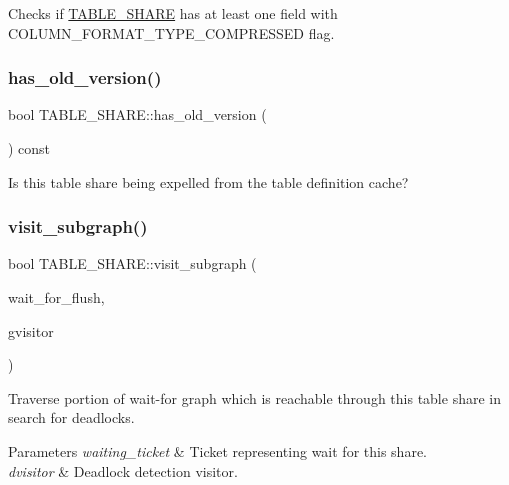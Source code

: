 Checks if \mbox{\hyperlink{structTABLE__SHARE}{T\+A\+B\+L\+E\+\_\+\+S\+H\+A\+RE}} has at least one field with C\+O\+L\+U\+M\+N\+\_\+\+F\+O\+R\+M\+A\+T\+\_\+\+T\+Y\+P\+E\+\_\+\+C\+O\+M\+P\+R\+E\+S\+S\+ED flag. \mbox{\label{structTABLE__SHARE_aa639ddd12ec5072322dee1af1a64efb4}} 
\subsubsection{\texorpdfstring{has\+\_\+old\+\_\+version()}{has\_old\_version()}}
{\footnotesize\ttfamily bool T\+A\+B\+L\+E\+\_\+\+S\+H\+A\+R\+E\+::has\+\_\+old\+\_\+version (\begin{DoxyParamCaption}{ }\end{DoxyParamCaption}) const\hspace{0.3cm}{\ttfamily [inline]}}

Is this table share being expelled from the table definition cache? \mbox{\label{structTABLE__SHARE_a084ed977027000a392ff8992d540f257}} 
\subsubsection{\texorpdfstring{visit\+\_\+subgraph()}{visit\_subgraph()}}
{\footnotesize\ttfamily bool T\+A\+B\+L\+E\+\_\+\+S\+H\+A\+R\+E\+::visit\+\_\+subgraph (\begin{DoxyParamCaption}\item[{\mbox{\hyperlink{classWait__for__flush}{Wait\+\_\+for\+\_\+flush}} $\ast$}]{wait\+\_\+for\+\_\+flush,  }\item[{\mbox{\hyperlink{classMDL__wait__for__graph__visitor}{M\+D\+L\+\_\+wait\+\_\+for\+\_\+graph\+\_\+visitor}} $\ast$}]{gvisitor }\end{DoxyParamCaption})}

Traverse portion of wait-\/for graph which is reachable through this table share in search for deadlocks.


\begin{DoxyParams}{Parameters}
{\em waiting\+\_\+ticket} & Ticket representing wait for this share. \\
\hline
{\em dvisitor} & Deadlock detection visitor.\\
\hline
\end{DoxyParams}

